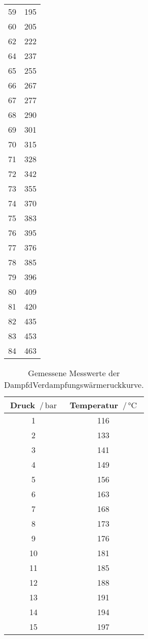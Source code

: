 \begin{table}[H]
\begin{tabular}{c c}
    59 & 195 \\
    60 & 205 \\
    62 & 222 \\
    64 & 237 \\
    65 & 255 \\
    66 & 267 \\
    67 & 277 \\
    68 & 290 \\
    69 & 301 \\
    70 & 315 \\
    71 & 328 \\
    72 & 342 \\
    73 & 355 \\
    74 & 370 \\
    75 & 383 \\
    76 & 395 \\
    77 & 376 \\
    78 & 385 \\
    79 & 396 \\
    80 & 409 \\
    81 & 420 \\
    82 & 435 \\
    83 & 453 \\
    84 & 463 \\
    \bottomrule
  \end{tabular}
\end{table}

\begin{table}[H]
  \centering
  \caption{Gemessene Messwerte der DampfdVerdampfungswärmeruckkurve.}
  \label{tab:werte1}
  \begin{tabular}{c c}
    \toprule
    Druck $\,/\,\si{\bar}$ & Temperatur $\,/\, \si{\celsius}$ \\
    \midrule
    1 & 116 \\
    2 & 133 \\
    3 & 141 \\
    4 & 149 \\
    5 & 156 \\
    6 & 163 \\
    7 & 168 \\
    8 & 173 \\
    9 & 176 \\
    10 & 181 \\
    11 & 185 \\
    12 & 188 \\
    13 & 191 \\
    14 & 194 \\
    15 & 197 \\
    \bottomrule
  \end{tabular}
\end{table}